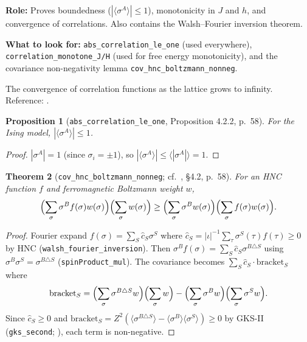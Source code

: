 \documentclass[a4paper,11pt]{article}
\newtheorem{theorem}{Theorem}
\newtheorem{proposition}[theorem]{Proposition}
\begin{document}
\textbf{Role:} Proves boundedness ($|\langle\sigma^A\rangle| \le 1$),
monotonicity in $J$ and $h$, and convergence of correlations.
Also contains the Walsh--Fourier inversion theorem.

\textbf{What to look for:} \texttt{abs\_correlation\_le\_one} (used
everywhere), \texttt{correlation\_monotone\_J/H} (used for free energy
monotonicity), and the covariance non-negativity lemma
\texttt{cov\_hnc\_boltzmann\_nonneg}.

The convergence of correlation functions as the lattice grows to infinity.
Reference: \cite[{\S4.2, pp.~58--59}]{glimm-jaffe}.

\begin{proposition}[\texttt{abs\_correlation\_le\_one}, Proposition 4.2.2, p.~58]
For the Ising model, $|\langle\sigma^A\rangle| \le 1$.
\end{proposition}

\begin{proof}
$|\sigma^A| = 1$ (since $\sigma_i = \pm 1$), so
$|\langle\sigma^A\rangle| \le \langle|\sigma^A|\rangle = 1$.
\end{proof}

\begin{theorem}[\texttt{cov\_hnc\_boltzmann\_nonneg};
  cf.\ \cite{glimm-jaffe}, {\S4.2, p.~58}]
\label{thm:cov-hnc}
For an HNC function $f$ and ferromagnetic Boltzmann weight $w$,
\[
  \Bigl(\sum_\sigma \sigma^B f(\sigma) w(\sigma)\Bigr)
  \Bigl(\sum_\sigma w(\sigma)\Bigr)
  \ge
  \Bigl(\sum_\sigma \sigma^B w(\sigma)\Bigr)
  \Bigl(\sum_\sigma f(\sigma) w(\sigma)\Bigr).
\]
\end{theorem}

\begin{proof}
Fourier expand $f(\sigma) = \sum_S \hat{c}_S \sigma^S$ where
$\hat{c}_S = |\iota|^{-1} \sum_\tau \sigma^S(\tau) f(\tau) \ge 0$
by HNC (\texttt{walsh\_fourier\_inversion}).
Then $\sigma^B f(\sigma) = \sum_S \hat{c}_S \sigma^{B \triangle S}$
using $\sigma^B \sigma^S = \sigma^{B \triangle S}$ (\texttt{spinProduct\_mul}).
The covariance becomes $\sum_S \hat{c}_S \cdot \text{bracket}_S$ where
\[
  \text{bracket}_S =
  \Bigl(\sum_\sigma \sigma^{B\triangle S} w\Bigr)\Bigl(\sum_\sigma w\Bigr)
  - \Bigl(\sum_\sigma \sigma^B w\Bigr)\Bigl(\sum_\sigma \sigma^S w\Bigr).
\]
Since $\hat{c}_S \ge 0$ and $\text{bracket}_S = Z^2(\langle\sigma^{B\triangle S}\rangle
- \langle\sigma^B\rangle\langle\sigma^S\rangle) \ge 0$ by GKS-II
(\texttt{gks\_second}; \cite[Theorem~3.49, p.~127]{friedli-velenik}),
each term is non-negative.
\end{proof}
\end{document}
